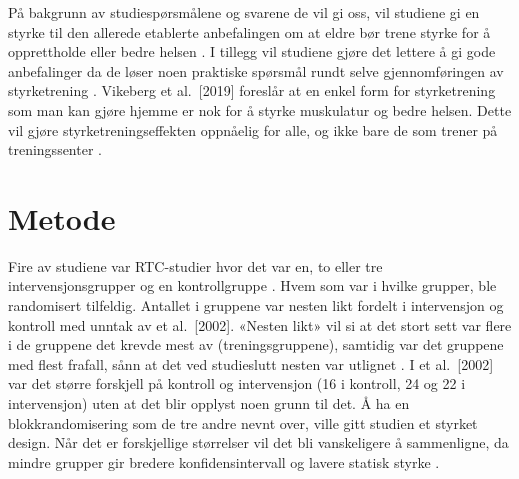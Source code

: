 \documentclass[
]{book}
\begin{document}
På bakgrunn av studiespørsmålene og svarene de vil gi oss, vil studiene gi en styrke til den allerede etablerte anbefalingen om at eldre bør trene styrke for å opprettholde eller bedre helsen \citetext{\citealp[ et al.~\href{mailto:2012;@Schott}{\nolinkurl{2012;@Schott}}, Johnen, and Holfelder 2019]{Geirsdottir}; \citealp[ et al.~2017]{Turpela}; \citealp[ et al.~2019]{vikberg}; \citealp[ et al.~2002]{vincent}}.
I tillegg vil studiene gjøre det lettere å gi gode anbefalinger da de løser noen praktiske spørsmål rundt selve gjennomføringen av styrketrening \citetext{\citealp[ et al.~2012]{Geirsdottir}; \citealp[Johnen, and Holfelder 2019]{Schott}; \citealp[ et al.~2017]{Turpela}; \citealp[ et al.~2019]{vikberg}; \citealp[ et al.~2002]{vincent}}.
Vikeberg et al.~{[}2019{]} foreslår at en enkel form for styrketrening som man kan gjøre hjemme er nok for å styrke muskulatur og bedre helsen.
Dette vil gjøre styrketreningseffekten oppnåelig for alle, og ikke bare de som trener på treningssenter \citep[ et al.~2019]{vikberg}.

\hypertarget{metode-1}{%
\section{Metode}\label{metode-1}}

Fire av studiene var RTC-studier hvor det var en, to eller tre intervensjonsgrupper og en kontrollgruppe \citetext{\citealp[Johnen, and Holfelder 2019]{Schott}; \citealp[ et al.~2017]{Turpela}; \citealp[ et al.~\href{mailto:2019;@vincent}{\nolinkurl{2019;@vincent}} et al.~2002]{vikberg}}.
Hvem som var i hvilke grupper, ble randomisert tilfeldig.
Antallet i gruppene var nesten likt fordelt i intervensjon og kontroll med unntak av \citet{vincent} et al.~{[}2002{]}.
«Nesten likt» vil si at det stort sett var flere i de gruppene det krevde mest av (treningsgruppene), samtidig var det gruppene med flest frafall, sånn at det ved studieslutt nesten var utlignet \citetext{\citealp[Johnen, and Holfelder 2019]{Schott}; \citealp[ et al.~2017]{Turpela}; \citealp[ et al.~2019]{vikberg}}.
I \citet{vincent} et al.~{[}2002{]} var det større forskjell på kontroll og intervensjon (16 i kontroll, 24 og 22 i intervensjon) uten at det blir opplyst noen grunn til det. Å ha en blokkrandomisering som de tre andre nevnt over, ville gitt studien et styrket design.
Når det er forskjellige størrelser vil det bli vanskeligere å sammenligne, da mindre grupper gir bredere konfidensintervall og lavere statisk styrke \citep[ 2013, s.
63, 146]{Hulley}.
\end{document}
